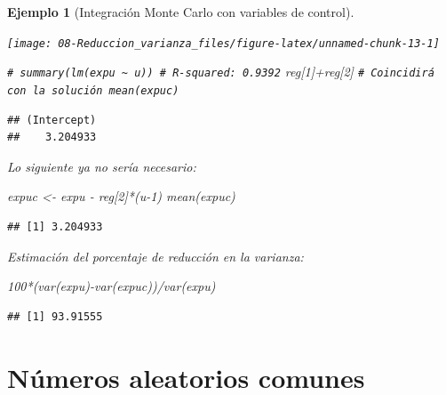 \documentclass[
]{book}
\newenvironment{Shaded}{\begin{snugshade}}{\end{snugshade}}
\newcommand{\CommentTok}[1]{\textcolor[rgb]{0.56,0.35,0.01}{\textit{#1}}}
\newcommand{\DecValTok}[1]{\textcolor[rgb]{0.00,0.00,0.81}{#1}}
\newcommand{\FunctionTok}[1]{\textcolor[rgb]{0.00,0.00,0.00}{#1}}
\newcommand{\NormalTok}[1]{#1}
\newcommand{\OtherTok}[1]{\textcolor[rgb]{0.56,0.35,0.01}{#1}}
\newcommand{\SpecialCharTok}[1]{\textcolor[rgb]{0.00,0.00,0.00}{#1}}
\theoremstyle{break}
\newtheorem{example}{Ejemplo}[chapter]
\theoremstyle{nonumberplain}
\renewcommand{\CommentTok}[1]{\textcolor[rgb]{0.41,0.41,0.41}{\texttt{#1}}}
\begin{document}
\begin{example}[Integración Monte Carlo con variables de control]
\begin{center}\texttt{[image: 08-Reduccion\_varianza\_files/figure-latex/unnamed-chunk-13-1]} \end{center}

\begin{Shaded}
\begin{Highlighting}[]
\CommentTok{\# summary(lm(expu \textasciitilde{} u)) \# R{-}squared: 0.9392}
\NormalTok{reg[}\DecValTok{1}\NormalTok{]}\SpecialCharTok{+}\NormalTok{reg[}\DecValTok{2}\NormalTok{] }\CommentTok{\# Coincidirá con la solución mean(expuc)}
\end{Highlighting}
\end{Shaded}

\begin{verbatim}
## (Intercept) 
##    3.204933
\end{verbatim}

Lo siguiente ya no sería necesario:

\begin{Shaded}
\begin{Highlighting}[]
\NormalTok{expuc }\OtherTok{\textless{}{-}}\NormalTok{ expu }\SpecialCharTok{{-}}\NormalTok{ reg[}\DecValTok{2}\NormalTok{]}\SpecialCharTok{*}\NormalTok{(u}\DecValTok{{-}1}\NormalTok{)}
\FunctionTok{mean}\NormalTok{(expuc)  }
\end{Highlighting}
\end{Shaded}

\begin{verbatim}
## [1] 3.204933
\end{verbatim}

Estimación del porcentaje de reducción en la varianza:

\begin{Shaded}
\begin{Highlighting}[]
\DecValTok{100}\SpecialCharTok{*}\NormalTok{(}\FunctionTok{var}\NormalTok{(expu)}\SpecialCharTok{{-}}\FunctionTok{var}\NormalTok{(expuc))}\SpecialCharTok{/}\FunctionTok{var}\NormalTok{(expu)}
\end{Highlighting}
\end{Shaded}

\begin{verbatim}
## [1] 93.91555
\end{verbatim}

\end{example}

\hypertarget{nuxfameros-aleatorios-comunes}{%
\section{Números aleatorios comunes}\label{nuxfameros-aleatorios-comunes}}
\end{document}

